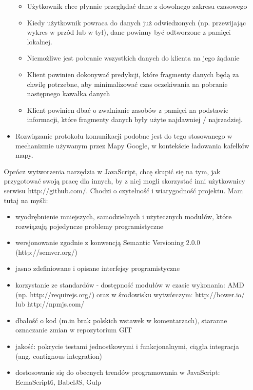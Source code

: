 \begin{itemize}
		\begin{itemize}
			\item Użytkownik chce płynnie przeglądać dane z dowolnego zakresu czasowego
			\item Kiedy użytkownik powraca do danych już odwiedzonych (np. przewijając wykres w przód lub w tył), dane powinny być odtworzone z pamięci lokalnej.
			\item Niemożliwe jest pobranie wszystkich danych do klienta na jego żądanie
			\item Klient powinien dokonywać predykcji, które fragmenty danych będą za chwilę potrzebne, aby minimalizować czas oczekiwania na pobranie następnego kawałka danych
			\item Klient powinien dbać o zwalnianie zasobów z pamięci na podstawie informacji, które fragmenty danych były użyte najdawniej / najrzadziej.
		\end{itemize}
	\item Rozwiązanie protokołu komunikacji podobne jest do tego stosowanego w mechanizmie używanym przez Mapy Google, w kontekście ładowania kafelków mapy.

\end{itemize}

Oprócz wytworzenia narzędzia w JavaScript, chcę skupić się na tym, jak przygotować swoją pracę dla innych, by z niej mogli skorzystać inni użytkownicy serwisu http://github.com/. Chodzi o czytelność i wiarygodność projektu. Mam tutaj na myśli:
\begin{itemize}
	\item wyodrębnienie mniejszych, samodzielnych i użytecznych  modułów, które rozwiązują pojedyncze problemy programistyczne
	\item wersjonowanie zgodnie z konwencją Semantic Versioning 2.0.0 (http://semver.org/)
	\item jasno zdefiniowane i opisane interfejsy programistyczne
	\item korzystanie ze standardów - dostępność modułów w czasie wykonania: AMD (np. http://requirejs.org/) oraz w środowisku wytwórczym: http://bower.io/ lub http://npmjs.com/
	\item dbałość o kod (m.in brak polskich wstawek w komentarzach), staranne oznaczanie zmian w repozytorium GIT
	\item jakość: pokrycie testami jednostkowymi i funkcjonalnymi, ciągła integracja (ang. contignous integration)
	\item dostosowanie się do obecnych trendów programowania w JavaScript: EcmaScript6, BabelJS, Gulp 


\end{itemize}



